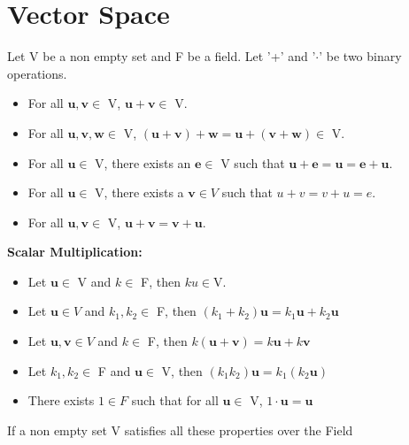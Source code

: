 \documentclass[a4paper, titlepage]{article}
\renewcommand{\vec}[1]{\bm{#1}}
\begin{document}
\begin{center}
    \date{$6^{\text{th}}$ September 2021}
\end{center}

\section{Vector Space}

Let V be a non empty set and F be a field. Let '+' and '$\cdot$' 
be two binary operations.
\begin{description}
    \item[\textbf{Vector Addition:}] \hfill
    \begin{itemize}
        \item For all $ \vec{u}, \vec{v} \in $ V, $ \vec{u} + \vec{v} \in $ V. 
        \item For all $ \vec{u}, \vec{v}, \vec{w} \in $ V, $ (\vec{u} + \vec{v}) + \vec{w} = \vec{u} + (\vec{v} + \vec{w}) \in $ V. 
        \item For all $ \vec{u} \in $ V, there exists an $\vec{e} \in $ V such
        that $ \vec{u} + \vec{e} = \vec{u} = \vec{e} + \vec{u} $. 
        \item For all $ \vec{u} \in $ V, there exists a $ \vec{v} \in V $ 
        such that $ u + v = v + u = e $. 
        \item For all $ \vec{u}, \vec{v} \in $ V, $ \vec{u} + \vec{v} = \vec{v} + \vec{u} $. 
    \end{itemize}
    \item \textbf{Scalar Multiplication: } \hfill
    \begin{itemize}
        \item Let $ \vec{u} \in $ V and $ k \in $ F, then 
        $ ku \in $V.
        \item Let $ \vec u \in V $ and $ k_1, k_2 \in $ F, then 
        $ (k_1 + k_2)\vec{u} = k_1\vec{u} + k_2\vec{u} $ 
        \item Let $ \vec{u}, \vec{v} \in V $ and $ k \in $ F,
        then $ k(\vec u + \vec v) = k\vec u + k\vec v $
        \item Let $ k_1, k_2 \in $ F and $ \vec u \in $ V, then
        $ (k_1k_2)\vec u = k_1(k_2\vec u)  $ 
        \item There exists $ 1 \in F $ such that for all $ \vec u
        \in $ V, $ 1\cdot\vec u = \vec u$
    \end{itemize}
\end{description}
If a non empty set V satisfies all these properties over the Field
\end{document}
